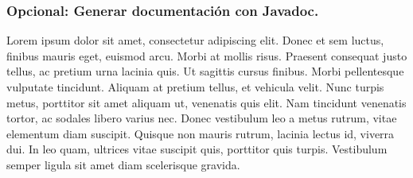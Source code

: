 \subsubsection*{Opcional: Generar documentación con Javadoc.}

Lorem ipsum dolor sit amet, consectetur adipiscing elit. Donec et sem luctus, finibus mauris eget, euismod arcu. Morbi at mollis risus. Praesent consequat justo tellus, ac pretium urna lacinia quis. Ut sagittis cursus finibus. Morbi pellentesque vulputate tincidunt. Aliquam at pretium tellus, et vehicula velit. Nunc turpis metus, porttitor sit amet aliquam ut, venenatis quis elit. Nam tincidunt venenatis tortor, ac sodales libero varius nec. Donec vestibulum leo a metus rutrum, vitae elementum diam suscipit. Quisque non mauris rutrum, lacinia lectus id, viverra dui. In leo quam, ultrices vitae suscipit quis, porttitor quis turpis. Vestibulum semper ligula sit amet diam scelerisque gravida.

